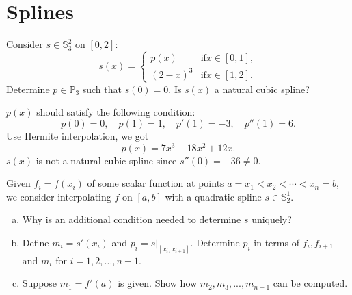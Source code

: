 \documentclass[11pt]{elegantbook}
\begin{document}
\chapter{Splines}

\begin{problem}
  Consider $s\in\mathbb{S}_3^2$ on $[0,2]$:
  \begin{equation*}
    s(x)=\left\{ \begin{array}{ll}p(x) & \text{if} x\in[0,1],\\ (2-x)^3 & \text{if} x\in[1,2].\end{array} \right.
  \end{equation*}
  Determine $p\in\mathbb{P}_3$ such that $s(0)=0$. Is $s(x)$ a natural cubic spline?
\end{problem}

\begin{solution}
  $p(x)$ should satisfy the following condition:
  \begin{equation*}
    p(0)=0, \quad p(1)=1, \quad p'(1)=-3, \quad p''(1)=6.
  \end{equation*}
  Use Hermite interpolation, we got
  \begin{equation*}
    p(x)=7x^3-18x^2+12x.
  \end{equation*}
  $s(x)$ is not a natural cubic spline since $s''(0)=-36\neq 0$.
\end{solution}

\vspace{1.5em}

\begin{problem}
  Given $f_i=f(x_i)$ of some scalar function at points $a=x_1<x_2<\cdots <x_n=b$, we consider interpolating $f$ on $[a,b]$ with a quadratic spline $s\in\mathbb{S}_2^1$.
  \begin{enumerate}[(a)]
    \item Why is an additional condition needed to determine $s$ uniquely?
    \item Define $m_i=s'(x_i)$ and $p_i=s|_{[x_i,x_{i+1}]}$. Determine $p_i$ in terms of $f_i,f_{i+1}$ and $m_i$ for $i=1,2,...,n-1$.
    \item Suppose $m_1=f'(a)$ is given. Show how $m_2,m_3,...,m_{n-1}$ can be computed.
  \end{enumerate}
\end{problem}
\end{document}
